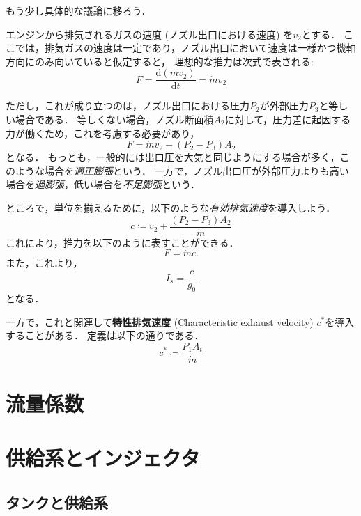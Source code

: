 \documentclass[uplatex,dvipdfmx,a4j,11pt]{jsreport}
\newcommand{\keyword}[1]{\textcolor{mainblue}{\textbf{#1}}}
\newcommand{\diff}{\mathrm{d}} %
\numberwithin{equation}{chapter}
\begin{document}
\enskip

もう少し具体的な議論に移ろう．

エンジンから排気されるガスの速度 (ノズル出口における速度) を$v_2$とする．
ここでは，排気ガスの速度は一定であり，ノズル出口において速度は一様かつ機軸方向にのみ向いていると仮定すると，
理想的な推力は次式で表される:
\begin{equation}
  F = \frac{\diff (mv_2)}{\diff t} = \dot{m} v_2
\end{equation}

ただし，これが成り立つのは，ノズル出口における圧力$P_2$が外部圧力$P_3$と等しい場合である．
等しくない場合，ノズル断面積$A_2$に対して，圧力差に起因する力が働くため，これを考慮する必要があり，
\begin{equation}
  F = \dot{m} v_2 + (P_2 - P_3) A_2
\end{equation}
となる．
もっとも，一般的には出口圧を大気と同じようにする場合が多く，このような場合を\emph{適正膨張}という．
一方で，ノズル出口圧が外部圧力よりも高い場合を\emph{過膨張}，低い場合を\emph{不足膨張}という．

ところで，単位を揃えるために，以下のような\emph{有効排気速度}を導入しよう．
\begin{equation}
  c \coloneqq v_2 + \frac{(P_2 - P_3) A_2}{\dot{m}}
\end{equation}
これにより，推力を以下のように表すことができる．
\begin{equation}
  F = \dot{m} c.
\end{equation}
また，これより，
\begin{equation}
  I_s = \frac{c}{g_0}
\end{equation}
となる．

一方で，これと関連して\keyword{特性排気速度} (Characteristic exhaust velocity) $c^*$を導入することがある．
定義は以下の通りである．
\begin{equation}
  c^* \coloneqq \frac{P_1 A_t}{\dot{m}}
\end{equation}



\section{流量係数}

\section{供給系とインジェクタ}

\subsection{タンクと供給系}
\end{document}
